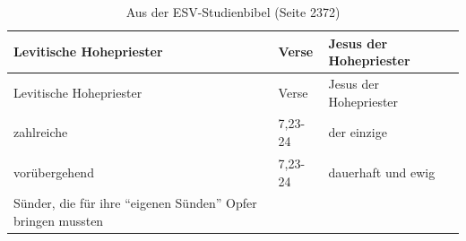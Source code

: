 \documentclass[]{krantz}
\begin{document}
\begin{longtable}[]{@{}lll@{}}
\caption{Aus der ESV-Studienbibel (Seite 2372)}\tabularnewline
\toprule
\begin{minipage}[b]{0.35\columnwidth}\raggedright\strut
Levitische Hohepriester\strut
\end{minipage} & \begin{minipage}[b]{0.19\columnwidth}\raggedright\strut
Verse\strut
\end{minipage} & \begin{minipage}[b]{0.34\columnwidth}\raggedright\strut
Jesus der Hohepriester\strut
\end{minipage}\tabularnewline
\midrule
\endfirsthead
\toprule
\begin{minipage}[b]{0.35\columnwidth}\raggedright\strut
Levitische Hohepriester\strut
\end{minipage} & \begin{minipage}[b]{0.19\columnwidth}\raggedright\strut
Verse\strut
\end{minipage} & \begin{minipage}[b]{0.34\columnwidth}\raggedright\strut
Jesus der Hohepriester\strut
\end{minipage}\tabularnewline
\midrule
\endhead
\begin{minipage}[t]{0.35\columnwidth}\raggedright\strut
zahlreiche\strut
\end{minipage} & \begin{minipage}[t]{0.19\columnwidth}\raggedright\strut
7,23-24\strut
\end{minipage} & \begin{minipage}[t]{0.34\columnwidth}\raggedright\strut
der einzige\strut
\end{minipage}\tabularnewline
\begin{minipage}[t]{0.35\columnwidth}\raggedright\strut
vorübergehend\strut
\end{minipage} & \begin{minipage}[t]{0.19\columnwidth}\raggedright\strut
7,23-24\strut
\end{minipage} & \begin{minipage}[t]{0.34\columnwidth}\raggedright\strut
dauerhaft und ewig\strut
\end{minipage}\tabularnewline
\begin{minipage}[t]{0.35\columnwidth}\raggedright\strut
Sünder, die für ihre ``eigenen Sünden'' Opfer bringen mussten\strut
\end{minipage} & \begin{minipage}[t]{0.19\columnwidth}\raggedright\strut

\end{minipage}
\end{longtable}
\end{document}
